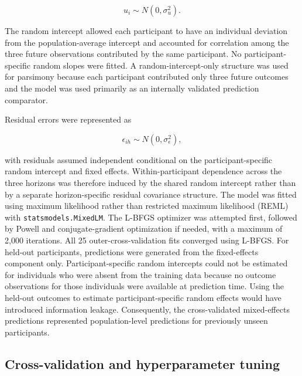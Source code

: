 \documentclass[11pt]{article}
\begin{document}
\begin{equation}
u_i \sim N(0,\sigma_u^2).
\end{equation}

The random intercept allowed each participant to have an individual deviation from
the population-average intercept and accounted for correlation among the three
future observations contributed by the same participant. No participant-specific
random slopes were fitted. A random-intercept-only structure was used for parsimony
because each participant contributed only three future outcomes and the model was
used primarily as an internally validated prediction comparator.

Residual errors were represented as

\begin{equation}
\epsilon_{ih} \sim N(0,\sigma_{\epsilon}^{2}),
\end{equation}

with residuals assumed independent conditional on the participant-specific random
intercept and fixed effects. Within-participant dependence across the three horizons
was therefore induced by the shared random intercept rather than by a separate
horizon-specific residual covariance structure. The model was fitted using maximum likelihood rather than restricted maximum
likelihood (REML) with \texttt{statsmodels.MixedLM}. The L-BFGS optimizer was
attempted first, followed by Powell and conjugate-gradient optimization if needed,
with a maximum of 2,000 iterations. All 25 outer-cross-validation fits converged
using L-BFGS. For held-out participants, predictions were generated from the fixed-effects
component only. Participant-specific random intercepts could not be estimated for
individuals who were absent from the training data because no outcome observations
for those individuals were available at prediction time. Using the held-out outcomes
to estimate participant-specific random effects would have introduced information
leakage. Consequently, the cross-validated mixed-effects predictions represented
population-level predictions for previously unseen participants.


\subsection{Cross-validation and hyperparameter tuning}
\end{document}
